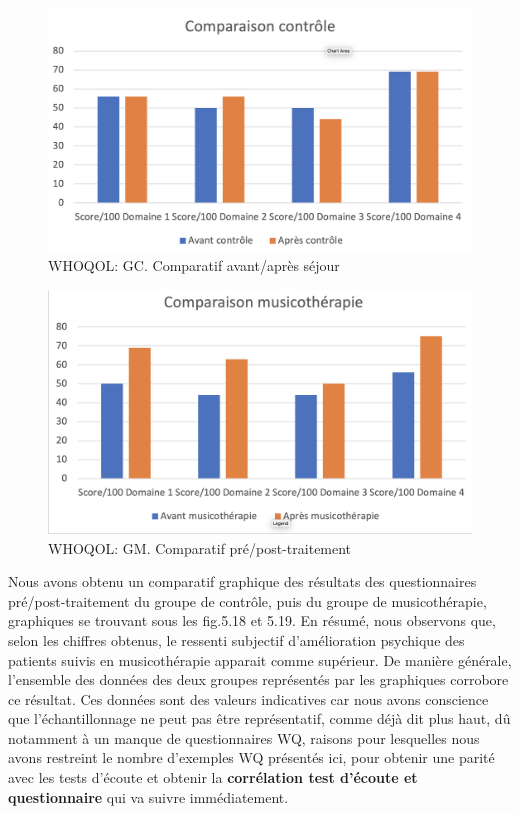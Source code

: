 \begin{figure}
\centering
\includegraphics[width=0.7\linewidth]{images/Compcontrole.png}
\caption[Schéma du déroulement]{WHOQOL:  GC. Comparatif avant/après séjour}

\end{figure}

\begin{figure}
\centering
\includegraphics[width=0.7\linewidth]{images/Compmusico.png}
\caption[Schéma du déroulement]{ WHOQOL: GM. Comparatif pré/post-traitement }

\end{figure}


Nous avons obtenu un comparatif graphique  des résultats des
questionnaires pré\-/post-traitement du groupe de contrôle,
puis du groupe de musicothérapie, graphiques se trouvant sous les fig.5.18 et 5.19.
       En résumé, nous observons que, selon les chiffres obtenus, le ressenti
       subjectif d'amélioration psychique
        des patients suivis en musicothérapie apparait comme
        supérieur.
        De manière générale, l'ensemble des données des deux groupes représentés
        par les graphiques corrobore ce résultat.
        Ces données sont des valeurs indicatives car nous avons conscience que l'échantillonnage ne
        peut pas être représentatif, comme déjà dit plus haut, dû
        notamment à un
        manque de
        questionnaires WQ, raisons pour lesquelles nous avons
        restreint le nombre d'exemples WQ présentés ici, pour obtenir
        une parité avec les tests d'écoute et obtenir la
        \textbf{corrélation test d'écoute et questionnaire} qui va
        suivre immédiatement.

